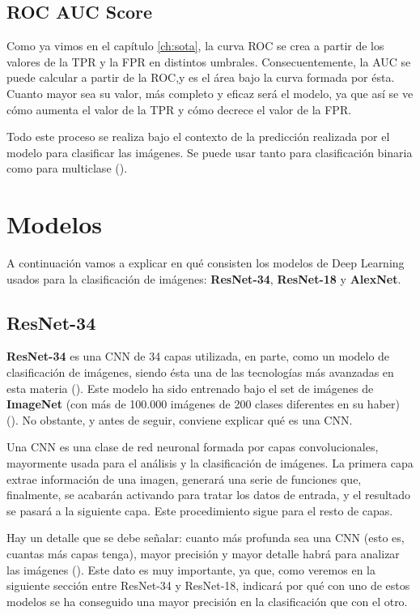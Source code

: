 \subsection{ROC AUC Score}

Como ya vimos en el capítulo \ref{ch:sota}, la curva \ac{ROC} se crea a partir de los valores de la \ac{TPR} y la \ac{FPR} en distintos umbrales. Consecuentemente, la \ac{AUC} se puede calcular a partir de la \ac{ROC},y es el área bajo la curva formada por ésta. Cuanto mayor sea su valor, más completo y eficaz será el modelo, ya que así se ve cómo aumenta el valor de la \ac{TPR} y cómo decrece el valor de la \ac{FPR}.

Todo este proceso se realiza bajo el contexto de la predicción realizada por el modelo para clasificar las imágenes. Se puede usar tanto para clasificación binaria como para multiclase (\cite{roc-auc-score}). %

\section{Modelos}

A continuación vamos a explicar en qué consisten los modelos de Deep Learning usados para la clasificación de imágenes: \textbf{ResNet-34}, \textbf{ResNet-18} y \textbf{AlexNet}.

\subsection{ResNet-34}

\textbf{ResNet-34} es una \ac{CNN} de 34 capas utilizada, en parte, como un modelo de clasificación de imágenes, siendo ésta una de las tecnologías más avanzadas en esta materia (\cite{resnet34}). Este modelo ha sido entrenado bajo el set de imágenes de \textbf{ImageNet} (con más de 100.000 imágenes de 200 clases diferentes en su haber) (\cite{imagenet}). No obstante, y antes de seguir, conviene explicar qué es una \ac{CNN}. %

Una \ac{CNN} es una clase de red neuronal formada por capas convolucionales, mayormente usada para el análisis y la clasificación de imágenes. La primera capa extrae información de una imagen, generará una serie de funciones que, finalmente, se acabarán activando para tratar los datos de entrada, y el resultado se pasará a la siguiente capa. Este procedimiento sigue para el resto de capas.

Hay un detalle que se debe señalar: cuanto más profunda sea una \ac{CNN} (esto es, cuantas más capas tenga), mayor precisión y mayor detalle habrá para analizar las imágenes (\cite{cnn}). Este dato es muy importante, ya que, como veremos en la siguiente sección entre ResNet-34 y ResNet-18, indicará por qué con uno de estos modelos se ha conseguido una mayor precisión en la clasificación que con el otro. %

